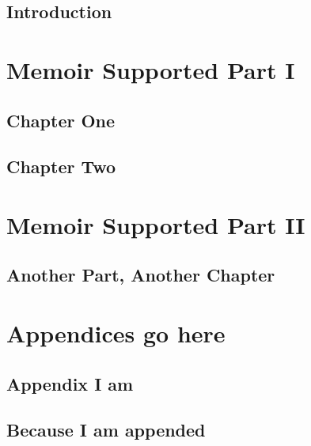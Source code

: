 \documentclass[
  a4paper, %
  11pt, %
  twoside,   %
  onecolumn, %
  openright, %
]{memoir}
\title{$1}
\author{$2}
\begin{document}
\frontmatter

\maketitle

\begin{abstract}
\lipsum[1-2]
\end{abstract}
\clearpage

\tableofcontents*
\clearpage

\chapter*[Intro Heading]{Introduction}

\lipsum[1-12]

\mainmatter

\part{Memoir Supported Part I}

\chapter[Chapter 1 TOC entry][Chapter One Heading]{Chapter One}

\lipsum[1-13] 

\chapter{Chapter Two}

\lipsum[1-14]

\part{Memoir Supported Part II}

\chapter{Another Part, Another Chapter}

\lipsum[1-14]

\appendix

\part{Appendices go here}

\chapter{Appendix I am}

\lipsum[1-9]

\chapter{Because I am appended}

\lipsum[1-11]

\backmatter


% 
% 
\end{document}
